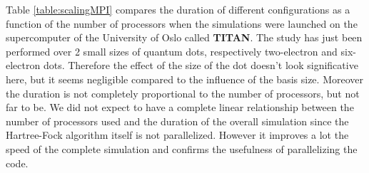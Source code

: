Table \ref{table:scalingMPI} compares the duration of different configurations as a function of the number of processors when the simulations were launched on the supercomputer of the University of Oslo called \textbf{TITAN}.
The study has just been performed over 2 small sizes of quantum dots, respectively two-electron and six-electron dots. Therefore the effect of the size of the dot doesn't look significative here, but it seems negligible compared to the influence of the basis size.
Moreover the duration is not completely proportional to the number of processors, but not far to be. We did not expect to have a complete linear relationship between the number of processors used and the duration of the overall simulation since the Hartree-Fock algorithm itself is not parallelized. However it improves a lot the speed of the complete simulation and confirms the usefulness of parallelizing the code.

